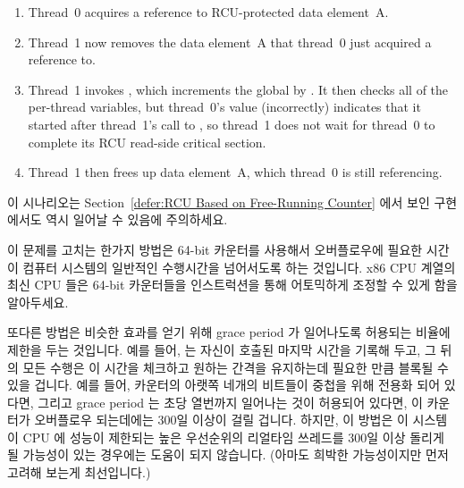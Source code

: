 {\begin{enumerate}
	\item	Thread~0 acquires a reference to RCU-protected data
		element~A.
	\item	Thread~1 now removes the data element~A that thread~0
		just acquired a reference to.
	\item	Thread~1 invokes , which
		increments the global  by
		.
		It then checks all of the per-thread 
		variables, but thread~0's value (incorrectly) indicates
		that it started after thread~1's call to
		, so thread~1 does not wait
		for thread~0 to complete its RCU read-side critical
		section.
	\item	Thread~1 then frees up data element~A, which thread~0
		is still referencing.
	\fi
	\end{enumerate}

	이 시나리오는
	Section~\ref{defer:RCU Based on Free-Running Counter} 에서 보인
	구현에서도 역시 일어날 수 있음에 주의하세요.

	이 문제를 고치는 한가지 방법은 64-bit 카운터를 사용해서 오버플로우에
	필요한 시간이 컴퓨터 시스템의 일반적인 수행시간을 넘어서도록 하는
	것입니다.
	x86 CPU 계열의 최신 CPU 들은 64-bit 카운터들을 
	인스트럭션을 통해 어토믹하게 조정할 수 있게 함을 알아두세요.
	\iffalse

	Note that scenario can also occur in the implementation presented in
	Section~\ref{sec:app:toyrcu:RCU Based on Free-Running Counter}.

	One strategy for fixing this problem is to use 64-bit
	counters so that the time required to overflow them would exceed
	the useful lifetime of the computer system.
	Note that non-antique members of the 32-bit x86 CPU family
	allow atomic manipulation of 64-bit counters via the
	\co{cmpxchg64b} instruction.
	\fi

	또다른 방법은 비슷한 효과를 얻기 위해 grace period 가 일어나도록
	허용되는 비율에 제한을 두는 것입니다.
	예를 들어,  는 자신이 호출된 마지막 시간을 기록해
	두고, 그 뒤의 모든 수행은 이 시간을 체크하고 원하는 간격을 유지하는데
	필요한 만큼 블록될 수 있을 겁니다.
	예를 들어, 카운터의 아랫쪽 네개의 비트들이 중첩을 위해 전용화 되어
	있다면, 그리고 grace period 는 초당 열번까지 일어나는 것이 허용되어
	있다면, 이 카운터가 오버플로우 되는데에는 300일 이상이 걸릴 겁니다.
	하지만, 이 방법은 이 시스템이 CPU 에 성능이 제한되는 높은 우선순위의
	리얼타임 쓰레드를 300일 이상 돌리게 될 가능성이 있는 경우에는 도움이
	되지 않습니다.
	(아마도 희박한 가능성이지만 먼저 고려해 보는게 최선입니다.)
	\iffalse

}

